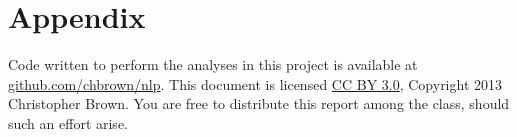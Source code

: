 \documentclass[11pt]{article}
\begin{document}
\section*{Appendix}

Code written to perform the analyses in this project is available at \href{https://github.com/chbrown/nlp}{github.com/chbrown/nlp}.
This document is licensed \href{http://creativecommons.org/licenses/by/3.0/}{CC BY 3.0}, Copyright 2013 Christopher Brown.
You are free to distribute this report among the class, should such an effort arise.


\end{document}
